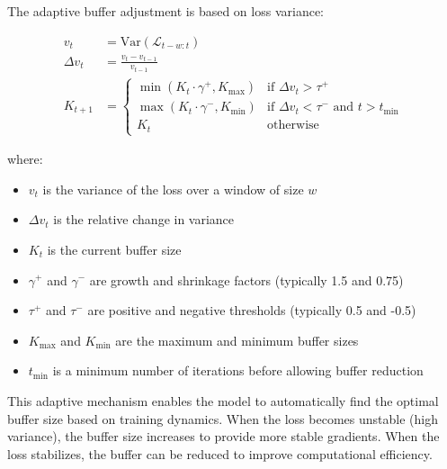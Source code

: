 \begin{equationbox}[title=Adaptive MoCo Buffer Adjustment]
  The adaptive buffer adjustment is based on loss variance:
  
  \begin{align}
    v_t &= \text{Var}(\mathcal{L}_{t-w:t})\\
    \Delta v_t &= \frac{v_t - v_{t-1}}{v_{t-1}}\\
    K_{t+1} &= \begin{cases}
      \min(K_t \cdot \gamma^+, K_{\max}) & \text{if } \Delta v_t > \tau^+\\
      \max(K_t \cdot \gamma^-, K_{\min}) & \text{if } \Delta v_t < \tau^- \text{ and } t > t_{\min}\\
      K_t & \text{otherwise}
    \end{cases}
  \end{align}
  
  where:
  \begin{itemize}
  \item $v_t$ is the variance of the loss over a window of size $w$
  \item $\Delta v_t$ is the relative change in variance
  \item $K_t$ is the current buffer size
  \item $\gamma^+$ and $\gamma^-$ are growth and shrinkage factors (typically 1.5 and 0.75)
  \item $\tau^+$ and $\tau^-$ are positive and negative thresholds (typically 0.5 and -0.5)
  \item $K_{\max}$ and $K_{\min}$ are the maximum and minimum buffer sizes
  \item $t_{\min}$ is a minimum number of iterations before allowing buffer reduction
  \end{itemize}
\end{equationbox}

This adaptive mechanism enables the model to automatically find the optimal buffer size based on training dynamics. When the loss becomes unstable (high variance), the buffer size increases to provide more stable gradients. When the loss stabilizes, the buffer can be reduced to improve computational efficiency.

